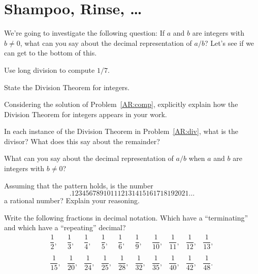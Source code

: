 \newpage
\section{Shampoo, Rinse, \dots}\label{A:Shampoo}




We're going to investigate the following question: If $a$ and $b$ are
integers with $b \ne 0$, what can you say about the decimal
representation of $a/b$? Let's see if we can get to the bottom of
this.

\begin{prob}\label{AR:comp} Use long division to compute $1/7$.
\end{prob}

\begin{prob}
State the Division Theorem for integers.
\end{prob}

\begin{prob}\label{AR:div}
Considering the solution of Problem~\ref{AR:comp}, explicitly
explain how the Division Theorem for integers appears in your work.
\end{prob}


\begin{prob} 
In each instance of the Division Theorem in Problem~\ref{AR:div}, what
is the divisor? What does this say about the remainder?
\end{prob}

\begin{prob} 
What can you say about the decimal representation of $a/b$ when $a$
and $b$ are integers with $b\ne 0$?
\end{prob}

\begin{prob} 
Assuming that the pattern holds, is the number
\[
.123456789101112131415161718192021\dots
\]
a rational number? Explain your reasoning.
\end{prob}




\begin{prob}\label{AR:exp}
Write the following fractions in decimal notation. Which have a
``terminating'' and which have a ``repeating'' decimal?
\[
\begin{array}{cccccccccc}
 \dfrac{1}{2}, &  \dfrac{1}{3}, &  \dfrac{1}{4}, &  \dfrac{1}{5}, &  \dfrac{1}{6}, & \dfrac{1}{9}, &  \dfrac{1}{10}, &  \dfrac{1}{11}, &  \dfrac{1}{12}, &  \dfrac{1}{13},  \\ \\
 \dfrac{1}{15}, & \dfrac{1}{20}, &  \dfrac{1}{24}, &  \dfrac{1}{25}, &  \dfrac{1}{28}, &  \dfrac{1}{32}, &  \dfrac{1}{35}, &  \dfrac{1}{40}, &  \dfrac{1}{42}, &  \dfrac{1}{48}.
\end{array}
\]
\end{prob}

